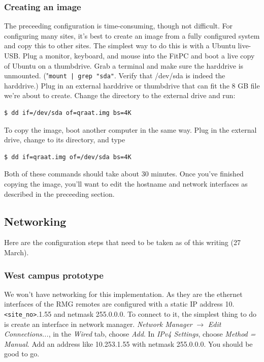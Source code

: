 \documentclass[letter]{article}
\begin{document}
\subsubsection{Creating an image}
The preceeding configuration is time-consuming, though not difficult. For configuring many sites, 
it's best to create an image from a fully configured system and copy this to other sites. The 
simplest way to do this is with a Ubuntu live-USB. Plug a monitor, keyboard, and mouse into the 
FitPC and boot a live copy of Ubuntu on a thumbdrive. Grab a terminal and make sure the harddrive
is unmounted. ("\texttt{mount | grep "sda"}. Verify that /dev/sda is indeed the 
harddrive.) Plug in an external harddrive or thumbdrive that can 
fit the 8 GB file we're about to create. Change the directory to the external drive and run: 
\begin{verbatim}
$ dd if=/dev/sda of=qraat.img bs=4K 
\end{verbatim}
To copy the image, boot another computer in the same way. Plug in the external drive, change to 
its directory, and type
\begin{verbatim}
$ dd if=qraat.img of=/dev/sda bs=4K
\end{verbatim}

Both of these commands should take about 30 minutes. Once you've finished copying the image, you'll 
want to edit the hostname and network interfaces as described in the preceeding section. 



\subsection{Networking}
Here are the configuration steps that need to be taken as of this writing (27 March).

\subsubsection{West campus prototype}
We won't have networking for this implementation. As they are the ethernet interfaces of the RMG 
remotes are configured with a static IP address 10.\texttt{<site\_no>}.1.55 and netmask 255.0.0.0. 
To connect to it, the simplest thing to do is create an interface 
in network manager. \textit{Network Manager} $\rightarrow$ \textit{Edit Connections...}, in the 
\textit{Wired} tab, choose \textit{Add}. In \textit{IPv4 Settings}, choose \textit{Method = Manual}. 
Add an address like 10.253.1.55 with netmask 255.0.0.0. You should be good to go.  
\end{document}
